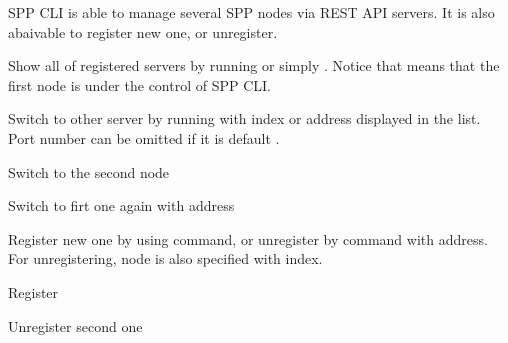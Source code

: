 \documentclass[a4paper,11pt,openany,oneside,english]{sphinxmanual}
\begin{document}
SPP CLI is able to manage several SPP nodes via REST API servers.
It is also abaivable to register new one, or unregister.

Show all of registered servers by running  or simply
. Notice that \sphinxcode{\sphinxupquote{*}} means that the first node is under the
control of SPP CLI.

\begin{sphinxVerbatim}[commandchars=\\\{\},formatcom=\footnotesize]

\end{sphinxVerbatim}

Switch to other server by running  with index or address displayed
in the list. Port number can be omitted if it is default .

\begin{sphinxVerbatim}[commandchars=\\\{\},formatcom=\footnotesize]
 Switch to the second node

 Switch to firt one again with address
\end{sphinxVerbatim}

Register new one by using  command, or unregister by  command
with address. For unregistering, node is also specified with index.

\begin{sphinxVerbatim}[commandchars=\\\{\},formatcom=\footnotesize]
 Register

 Unregister second one
\end{sphinxVerbatim}
\end{document}
